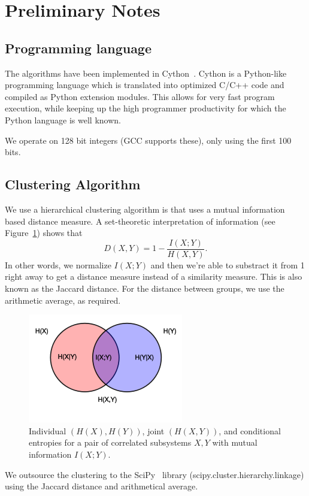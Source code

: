 \documentclass[12pt]{article}
\theoremstyle{definition}
\begin{document}
\maketitle

\section{Preliminary Notes}

\subsection*{Programming language}
The algorithms have been implemented in Cython~\cite{cython}.
Cython is a Python-like programming language which is translated into optimized
C/C++ code and compiled as Python extension modules.
This allows for very fast program execution, while keeping up the high programmer
productivity for which the Python language is well known.

We operate on 128 bit integers (GCC supports these), only using the first 100 bits.

\subsection*{Clustering Algorithm}
We use a hierarchical clustering algorithm is that uses a mutual information based distance measure.
A set-theoretic interpretation of information (see Figure~\ref{fig:venn}) shows that
\[D(X,Y) = 1 - \frac{I(X;Y)}{H(X,Y)}.\]
In other words, we normalize $I(X;Y)$ and then we're able to substract it from 1 right away to get a distance measure instead of a similarity measure.
This is also known as the Jaccard distance.
For the distance between groups, we use the arithmetic average, as required.
\begin{figure}[!htb]
    \centering
    \includegraphics{images/venn.png}
    \caption{Individual $(H(X), H(Y))$, joint $(H(X, Y))$, and conditional entropies for a pair of correlated subsystems $X,Y$ with mutual information $I(X; Y)$.}
\label{fig:venn}
\end{figure}
We outsource the clustering to the SciPy~\cite{scipy} library (scipy.cluster.hierarchy.linkage) using the Jaccard distance and arithmetical average.
\end{document}
